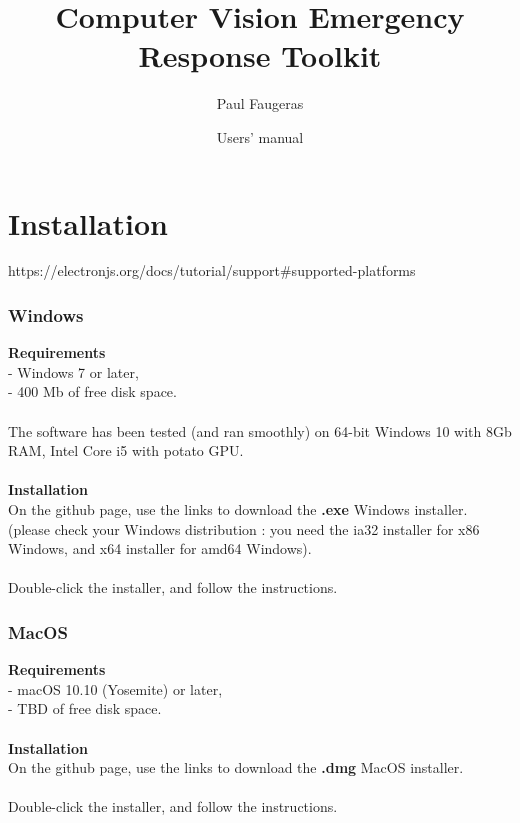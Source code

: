 \documentclass[12pt,a4paper]{article}
\author{Paul Faugeras}
\date{Users' manual}
\title{Computer Vision Emergency Response Toolkit}
\begin{document}
\pagebreak

\begin{LARGE}
	\maketitle
\end{LARGE}

\pagebreak

\tableofcontents

\pagebreak

\part{Installation}

https://electronjs.org/docs/tutorial/support\#supported-platforms

\section{Windows}
\textbf{Requirements}\\
- Windows 7 or later,\\
- 400 Mb of free disk space.\\
~\\
The software has been tested (and ran smoothly) on 64-bit Windows 10 with 8Gb RAM, Intel Core i5 with potato GPU.\\
~\\
\textbf{Installation}\\
On the github page, use the links to download the \textbf{.exe} Windows installer. (please check your Windows distribution : you need the ia32 installer for x86 Windows, and x64 installer for amd64 Windows).\\
~\\
Double-click the installer, and follow the instructions.

\section{MacOS}
\textbf{Requirements}\\
- macOS 10.10 (Yosemite) or later,\\
- TBD of free disk space.\\
~\\
\textbf{Installation}\\
On the github page, use the links to download the \textbf{.dmg} MacOS installer.\\
~\\
Double-click the installer, and follow the instructions.
\end{document}
